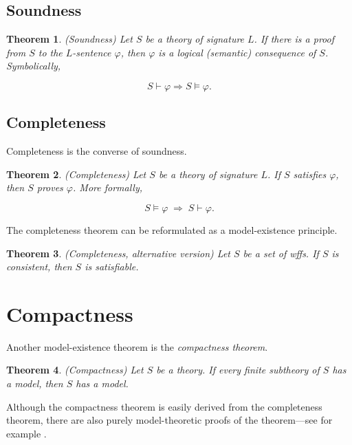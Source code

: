 \documentclass[10pt, a4paper, oneside]{article}
\newtheorem{thm}{Theorem}[section]
\theoremstyle{definition}
\theoremstyle{remark}
\theoremstyle{plain}
\begin{document}
\subsection{Soundness}

\begin{thm}
    (Soundness) Let $S$ be a theory of signature $L$. If there is a proof from
    $S$ to the $L$-sentence $\varphi$, then $\varphi$ is a logical (semantic)
    consequence of $S$. Symbolically,
    
    \begin{displaymath}
        S \vdash \varphi \Longrightarrow S \models \varphi.
    \end{displaymath}
\end{thm}

\subsection{Completeness}

Completeness is the converse of soundness.

\begin{thm}
    (Completeness) Let $S$ be a theory of signature $L$. If $S$ satisfies
    $\varphi$, then $S$ proves $\varphi$. More formally,
    
    \begin{displaymath}
        S \models \varphi \; \Longrightarrow \; S \vdash \varphi.
    \end{displaymath}
\end{thm}

The completeness theorem can be reformulated as a model-existence principle.

\begin{thm}
    (Completeness, alternative version) Let $S$ be a set of wffs. If $S$ is
    consistent, then $S$ is satisfiable.
\end{thm}

\section{Compactness}

Another model-existence theorem is the \emph{compactness theorem}.

\begin{thm}
    (Compactness) Let $S$ be a theory. If every finite subtheory of $S$ has a
    model, then $S$ has a model.
\end{thm}

Although the compactness theorem is easily derived from the completeness
theorem, there are also purely model-theoretic proofs of the theorem---see for
example \citet[pp. 125--127]{hodges1997}.
\end{document}
